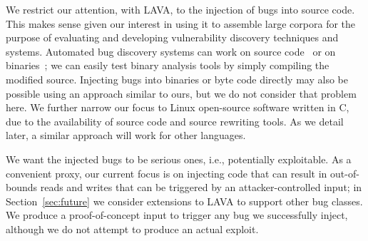 
We restrict our attention, with LAVA, to the injection of bugs into source code.
This makes sense given our interest in using it to assemble large corpora for the purpose of evaluating and developing vulnerability discovery techniques and systems.
Automated bug discovery systems can work on source
code~\cite{Cadar:2008, Ganesh:2009, Haller:2013, Yamaguchi:2014} or on
binaries~\cite{Cha:2012, Wang:2010};
we can easily test binary analysis tools by simply compiling the modified source.
Injecting bugs into binaries or byte code directly may also be possible using an approach similar to ours, but we do not consider that problem here.
We further narrow our focus to Linux open-source software written in C, due to the availability of source code and source rewriting tools.
As we detail later, a similar approach will work for other languages.

We want the injected bugs to be serious ones, i.e., potentially exploitable.
As a convenient proxy, our current focus is on injecting code that can result in out-of-bounds reads and writes that can be triggered by an attacker-controlled input; in Section~\ref{sec:future} we consider extensions to LAVA to support other bug classes.
We produce a proof-of-concept input to trigger any bug we successfully inject, although we do not attempt to produce an actual exploit.
